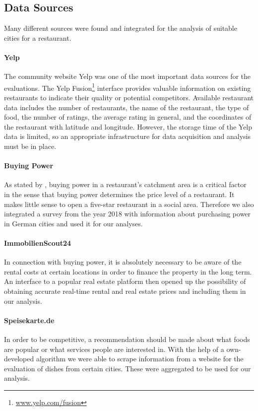 \subsection{Data Sources}
\label{subsec:sources}
Many different sources were found and integrated for the analysis of suitable cities for a restaurant.
\newline
\paragraph{Yelp}
The community website Yelp was one of the most important data sources for the evaluations. The Yelp Fusion\footnote{\href{https://www.yelp.com/fusion}{www.yelp.com/fusion}} interface provides valuable information on existing restaurants to indicate their quality or potential competitors. Available restaurant data includes the number of restaurants, the name of the restaurant, the type of food, the number of ratings, the average rating in general, and the coordinates of the restaurant with latitude and longitude. However, the storage time of the Yelp data is limited, so an appropriate infrastructure for data acquisition and analysis must be in place.
\newline
\paragraph {Buying Power}
As stated by \cite{locana}, buying power in a restaurant's catchment area is a critical factor in the sense that buying power determines the price level of a restaurant. It makes little sense to open a five-star restaurant in a social area. Therefore we also integrated a survey \cite{buyingpower} from the year 2018 with information about purchasing power in German cities and used it for our analyses.
\newline
\paragraph{ImmobilienScout24}
In connection with buying power, it is absolutely necessary to be aware of the rental costs at certain locations in order to finance the property in the long term\cite{locana}. An interface to a popular real estate platform \cite{ImmoScout} then opened up the possibility of obtaining accurate real-time rental and real estate prices and including them in our analysis.
\newline
\paragraph{Speisekarte.de}
In order to be competitive, a recommendation should be made about what foods are popular or what services people are interested in. With the help of a own-developed algorithm we were able to scrape information from a website \cite{speisekarte} for the evaluation of dishes from certain cities. These were aggregated to be used for our analysis.
\newline
